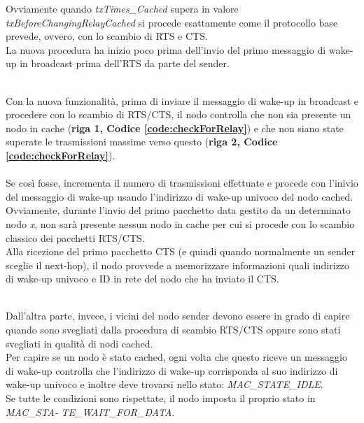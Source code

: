 Ovviamente quando \textit{txTimes\_Cached} supera in valore \textit{txBeforeChangingRelayCached} si procede esattamente come il protocollo base prevede, ovvero, con lo scambio di RTS e CTS.\\

La nuova procedura ha inizio poco prima dell'invio del primo messaggio di wake-up in broadcast prima dell'RTS da parte del sender.

 \\

Con la nuova funzionalità, prima di inviare il messaggio di wake-up in broadcast e procedere con lo scambio di RTS/CTS, il nodo controlla che non sia presente un nodo in cache (\textbf{riga 1, Codice \ref{code:checkForRelay}}) e che non siano state superate le trasmissioni massime verso questo (\textbf{riga 2, Codice \ref{code:checkForRelay}}).\\
\\
Se così fosse, incrementa il numero di trasmissioni effettuate e procede con l'inivio del messaggio di wake-up usando l'indirizzo di wake-up univoco del nodo cached.\\

Ovviamente, durante l'invio del primo pacchetto data gestito da un determinato nodo \textit{x}, non sarà presente nessun nodo in cache per cui si procede con lo scambio classico dei pacchetti RTS/CTS.\\
Alla ricezione del primo pacchetto CTS (e quindi quando normalmente un sender sceglie il next-hop), il nodo provvede a memorizzare informazioni quali indirizzo di wake-up univoco e ID in rete del nodo che ha inviato il CTS.

 \\

Dall'altra parte, invece, i vicini del nodo sender devono essere in grado di capire quando sono svegliati dalla procedura di scambio RTS/CTS oppure sono stati svegliati in qualità di nodi cached.\\
Per capire se un nodo è stato cached, ogni volta che questo riceve un messaggio di wake-up controlla che l'indirizzo di wake-up corrisponda al suo indirizzo di wake-up univoco e inoltre deve trovarsi nello stato: \textit{MAC\_STATE\_IDLE}. \\
Se tutte le condizioni sono rispettate, il nodo imposta il proprio stato in \textit{MAC\_STA-} \textit{TE\_WAIT\_FOR\_DATA}.

 \\

